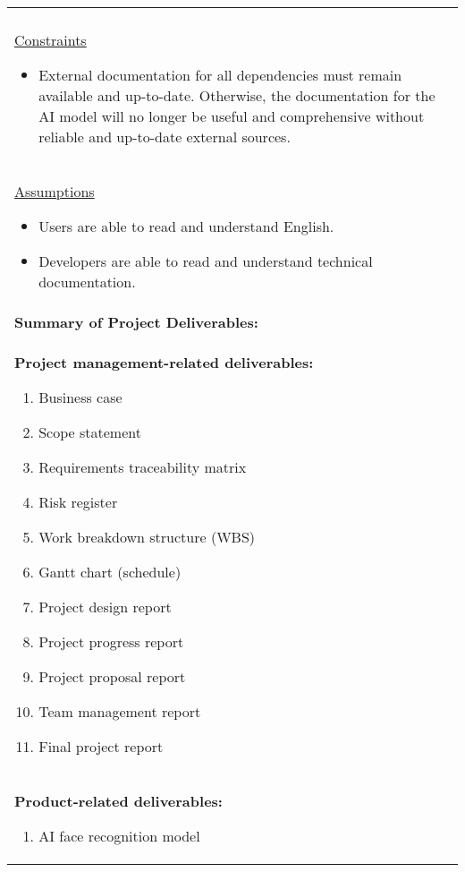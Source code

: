 \begin{longtable}{ | p{} l | }
{    } \\
    \multicolumn{2}{|p{\textwidth}|}{\hspace{0.6cm}\underline{Constraints}
        \begin{itemize}
            \item External documentation for all dependencies must remain available and up-to-date. Otherwise, the documentation for the AI model will no longer be useful and comprehensive without reliable and up-to-date external sources.
        \end{itemize}
    } \\
    \multicolumn{2}{|p{\textwidth}|}{\hspace{0.6cm}\underline{Assumptions}
        \begin{itemize}
            \item Users are able to read and understand English.
            \item Developers are able to read and understand technical documentation.
        \end{itemize}
    } \\
    \hline
    \multicolumn{2}{|l|}{\textbf{Summary of Project Deliverables:}} \\
    \multicolumn{2}{|p{\textwidth}|}{\textbf{Project management-related deliverables:}
        \begin{enumerate}
            \item Business case
            \item Scope statement
            \item Requirements traceability matrix
            \item Risk register
            \item Work breakdown structure (WBS)
            \item Gantt chart (schedule)
            \item Project design report
            \item Project progress report
            \item Project proposal report
            \item Team management report
            \item Final project report
        \end{enumerate}
    } \\
    \multicolumn{2}{|p{\textwidth}|}{\textbf{Product-related deliverables:}
        \begin{enumerate}
            \item AI face recognition model

\end{enumerate}}
\end{longtable}
